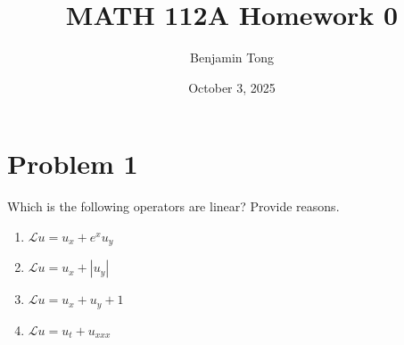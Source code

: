\documentclass{ben}
\title{MATH 112A Homework 0}
\author{Benjamin Tong}
\date{October 3, 2025}
\begin{document}
    \maketitle
    \section{Problem 1}
    Which is the following operators are linear? Provide reasons.
    \begin{enumerate}[label=(\textbf{\arabic*)}]
        \item $\mathscr{L}u = u_x + e^x u_y$
        \item $\mathscr{L}u = u_x + |u_y|$
        \item $\mathscr{L}u = u_x + u_y + 1$
        \item $\mathscr{L}u = u_t + u_{xxx}$
    \end{enumerate}
\end{document}
